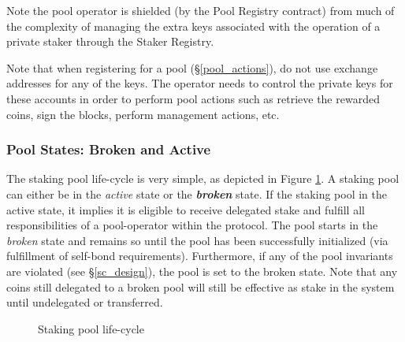 Note the pool operator is shielded (by the Pool Registry contract) from much of the complexity of managing the extra keys associated with the operation of a private staker through the Staker Registry. 

Note that when registering for a pool (\S\ref{pool_actions}), do not use exchange addresses for any of the keys. The operator needs to control the private keys for these accounts in order to perform pool actions such as retrieve the rewarded coins, sign the blocks, perform management actions, etc. 

\subsubsection{Pool States: Broken and Active} \label{pool_states}

The staking pool life-cycle is very simple, as depicted in Figure \ref{fig:pool_lifecycle}. A staking pool can either be in the \textit{active} state or the \textbf{\textit{broken}} state. If the staking pool in the active state, it implies it is eligible to receive delegated stake and fulfill all responsibilities of a pool-operator within the protocol. The pool starts in the \textit{broken} state and remains so until the pool has been successfully initialized (via fulfillment of self-bond requirements). Furthermore, if any of the pool invariants are violated (see \S\ref{sc_design}), the pool is set to the broken state. Note that any coins still delegated to a broken pool will still be effective as stake in the system until undelegated or transferred.  

\begin{figure}[ht]
\centering
{}
\begin{center}
\end{center}
\caption{Staking pool life-cycle}
\label{fig:pool_lifecycle}
\end{figure}

